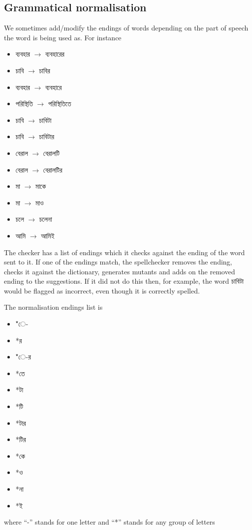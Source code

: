 \documentclass[11pt]{article}
\begin{document}
\subsection{Grammatical normalisation}
We sometimes add/modify the endings of words depending on the part of speech the word is being used as. For instance \begin{itemize}
\item {\lbng ব্যবহার} $\rightarrow$ {\lbng ব্যবহারের}
\item {\lbng চাবি} $\rightarrow$ {\lbng চাবির}
\item {\lbng ব্যবহার} $\rightarrow$ {\lbng ব্যবহারে}
\item {\lbng পরিস্থিতি} $\rightarrow$ {\lbng পরিস্থিতিতে}
\item {\lbng চাবি} $\rightarrow$ {\lbng চাবিটা}
\item {\lbng চাবি} $\rightarrow$ {\lbng চাবিটার}
\item {\lbng বেরাল} $\rightarrow$ {\lbng বেরালটি}
\item {\lbng বেরাল} $\rightarrow$ {\lbng বেরালটির}
\item {\lbng মা} $\rightarrow$ {\lbng মাকে}
\item {\lbng মা} $\rightarrow$ {\lbng মাও}
\item {\lbng চলে} $\rightarrow$ {\lbng চলেনা}
\item {\lbng আমি} $\rightarrow$ {\lbng আমিই}
\end{itemize}
The checker has a list of endings which it checks against the ending of the word sent to it. If one of the endings match, the spellchecker removes the ending, checks it against the dictionary, generates mutants and adds on the removed ending to the suggestions. If it did not do this then, for example, the word {\bng চাবিটা} would be flagged as incorrect, even though it is correctly spelled.

\pagebreak
The normalisation endings list is
{\lbng 
\begin{itemize}
\item *ে-
\item *র
\item *ে-র
\item *তে
\item *টা
\item *টি
\item *টার
\item *টির
\item *কে
\item *ও
\item *না
\item *ই
\end{itemize}
}
where ``-'' stands for one letter and ``*'' stands for any group of letters
\end{document}
